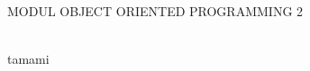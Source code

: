 \begin{titlepage}

\begin{center}
{\large MODUL OBJECT ORIENTED PROGRAMMING 2}

\HRule\\[1cm]

tamami

\vfill

\end{center}

\end{titlepage}